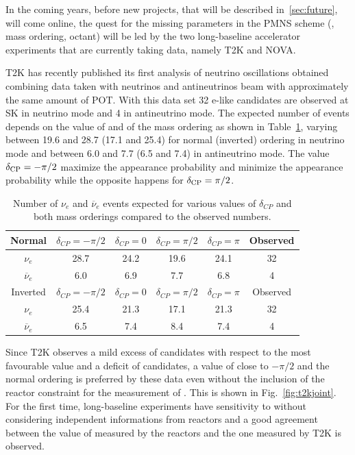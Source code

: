 

In the coming years, before new projects, that will be described in~\ref{sec:future}, will come online, the quest for the missing parameters in the PMNS scheme (\dcp, mass ordering, \thatm octant) will be led by the two long-baseline accelerator experiments that are currently taking data, namely T2K and NOVA.

T2K has recently published its first analysis of neutrino oscillations obtained combining data taken with neutrinos and antineutrinos beam with approximately the same amount of POT\cite{t2k2016}. With this data set 32 e-like candidates are observed at SK in neutrino mode and 4 in antineutrino mode. The expected number of events depends on the value of \dcp and of the mass ordering as shown in Table~\ref{tab:evtnue}, varying between 19.6 and 28.7 (17.1 and 25.4) for normal (inverted) ordering in neutrino mode and between 6.0 and 7.7 (6.5 and 7.4) in antineutrino mode. The value $\delta_{\mathrm{CP}}=-\pi/2$ maximize the \nue appearance probability and minimize the \nueb appearance probability while the opposite happens for $\delta_{\mathrm{CP}}=\pi/2$. 

\begin{table}[htbp]
    \centering
    \caption{Number of $\nu_e$ and $\overline{\nu}_e$ events expected for various values of $\delta_{CP}$ and both mass orderings 
    compared to the observed numbers.}
    \label{tab:evtnue}
    \begin{tabular}{|c|c|c|c|c|c|}
        \hline
        Normal & $\delta_{CP}= -\pi/2$ & $\delta_{CP}= 0 $ & $\delta_{CP}= \pi/2$ &  $\delta_{CP}= \pi$  & Observed\\
        \hline 
        $\nu_e$ &   28.7 & 24.2& 19.6& 24.1& 32 \\
        $\overline{\nu}_e$ &  6.0 &6.9& 7.7 &6.8 &4 \\     
        \hline
        \hline
        Inverted & $\delta_{CP}= -\pi/2$ & $\delta_{CP}= 0 $ & $\delta_{CP}= \pi/2$ &  $\delta_{CP}= \pi$  & Observed\\
        \hline 
        $\nu_e$ 			& 25.4 	& 21.3	& 17.1	& 21.3	& 32 \\
        $\overline{\nu}_e$ 	& 6.5 	& 7.4		& 8.4		& 7.4		&4 \\    
\hline
    \end{tabular}
\end{table}


Since T2K observes a mild excess of \nue candidates with respect to the most favourable value and a deficit of \nueb candidates, a value of \dcp close to $-\pi/2$ and the normal ordering is preferred by these data even without the inclusion of the reactor constraint for the measurement of \thint. This is shown in Fig.~\ref{fig:t2kjoint}. For the first time, long-baseline experiments have sensitivity to \dcp without considering independent informations from reactors and a good agreement between the value of \thint measured by the reactors and the one measured by T2K is observed. 


